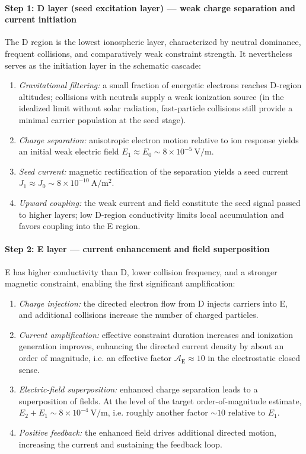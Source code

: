 \documentclass[11pt,a4paper]{article}
\begin{document}
\paragraph{Step 1: D layer (seed excitation layer) --- weak charge separation and current initiation}
The D region is the lowest ionospheric layer, characterized by neutral dominance, frequent collisions, and comparatively weak constraint strength. It nevertheless serves as the initiation layer in the schematic cascade:
\begin{enumerate}
  \item \emph{Gravitational filtering:} a small fraction of energetic electrons reaches D-region altitudes; collisions with neutrals supply a weak ionization source (in the idealized limit without solar radiation, fast-particle collisions still provide a minimal carrier population at the seed stage).
  \item \emph{Charge separation:} anisotropic electron motion relative to ion response yields an initial weak electric field $E_1\approx E_0\sim 8\times10^{-5}\ \mathrm{V/m}$.
  \item \emph{Seed current:} magnetic rectification of the separation yields a seed current $J_1\approx J_0\sim 8\times10^{-10}\ \mathrm{A/m^2}$.
  \item \emph{Upward coupling:} the weak current and field constitute the seed signal passed to higher layers; low D-region conductivity limits local accumulation and favors coupling into the E region.
\end{enumerate}

\paragraph{Step 2: E layer --- current enhancement and field superposition}
E has higher conductivity than D, lower collision frequency, and a stronger magnetic constraint, enabling the first significant amplification:
\begin{enumerate}
  \item \emph{Charge injection:} the directed electron flow from D injects carriers into E, and additional collisions increase the number of charged particles.
  \item \emph{Current amplification:} effective constraint duration increases and ionization generation improves, enhancing the directed current density by about an order of magnitude, i.e. an effective factor $\mathcal{A}_{\mathrm{E}}\approx 10$ in the electrostatic closed sense.
  \item \emph{Electric-field superposition:} enhanced charge separation leads to a superposition of fields. At the level of the target order-of-magnitude estimate, $E_2+E_1\sim 8\times10^{-4}\ \mathrm{V/m}$, i.e. roughly another factor $\sim 10$ relative to $E_1$.
  \item \emph{Positive feedback:} the enhanced field drives additional directed motion, increasing the current and sustaining the feedback loop.
\end{enumerate}
\end{document}
